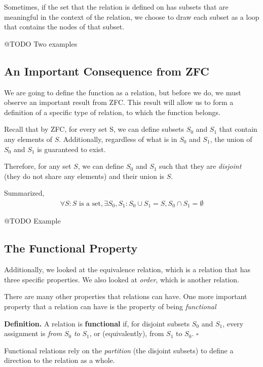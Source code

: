 \documentclass[letterpaper,twoside]{article}
\def\SmallHSpace{\hspace*{1mm}}
\newcommand{\DefinedTerm}[1]{\textbf{#1}}
\newcommand{\Definition}[1]{%
    \emoji{book} \textbf{Definition.}\SmallHSpace #1 \hfill $\square$
}
\begin{document}
\begin{multicols*}{2}
Sometimes, if the set that the relation is defined on has subsets that are meaningful in the context of the relation, we choose to draw each subset as a loop that contains the nodes of that subset.

@TODO Two examples

\subsection{An Important Consequence from ZFC}

We are going to define the function as a relation, but before we do, we must observe an important result from ZFC.
This result will allow us to form a definition of a specific type of relation, to which the function belongs.

Recall that by ZFC, for every set S, we can define subsets $S_0$ and $S_1$ that contain any elements of $S$.
Additionally, regardless of what is in $S_0$ and $S_1$, the union of $S_0$ and $S_1$ is guaranteed to exist.

Therefore, for any set $S$, we can define $S_0$ and $S_1$ such that they are \textit{disjoint} (they do not share any elements) and their union is $S$.

Summarized,
\begin{align}
    \forall S : S \text{ is a set}, \exists S_0, S_1 : S_0 \cup S_1 = S, S_0 \cap S_1 = \emptyset
\end{align}

@TODO Example

\subsection{The Functional Property}

Additionally, we looked at the equivalence relation, which is a relation that has three specific properties.
We also looked at \textit{order}, which is another relation.

There are many other properties that relations can have.
One more important property that a relation can have is the property of being \textit{functional}

\Definition
{
    A relation is \DefinedTerm{functional} if, for disjoint subsets $S_0$ and $S_1$, every assignment is \textit{from} $S_0$ \textit{to} $S_1$, or (equivalently), from $S_1$ to $S_0$.
}

Functional relations rely on the \textit{partition} (the disjoint subsets) to define a direction to the relation as a whole.


\end{multicols*}
\end{document}
